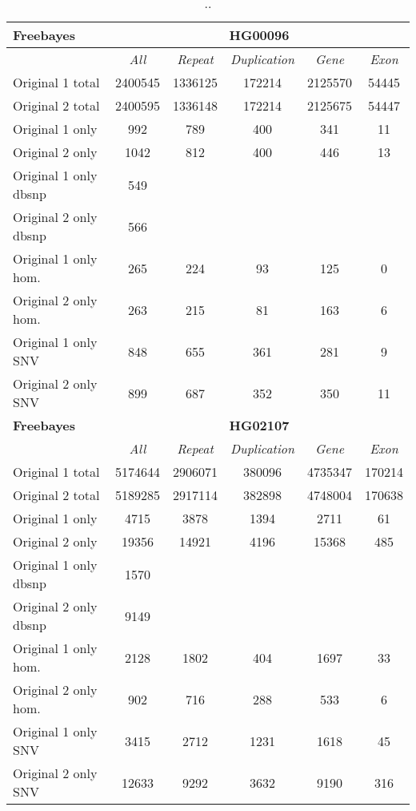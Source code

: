 \begin{table}[htb]
\begin{center}
\begin{tabular}{|l|c||c|c|c|c|}
\hline
{\bf Freebayes} & \multicolumn{5}{|c|}{\bf HG00096} \\
\hline
\cline{2-6}
{\bf} & {\it All} & {\it Repeat} & {\it Duplication} & {\it Gene} & {\it Exon} \\
\hline
Original 1 total & 2400545 & 1336125 & 172214 & 2125570 & 54445\\ 
\hline
Original 2 total & 2400595 & 1336148 & 172214 & 2125675 & 54447\\ 
\hline
Original 1 only & 992 & 789 & 400 & 341 & 11\\ 
\hline
Original 2 only & 1042 & 812 & 400 & 446 & 13\\ 
\hline
Original 1 only dbsnp & 549 &  &  &  & \\ 
\hline
Original 2 only dbsnp & 566 &  &  &  & \\ 
\hline
Original 1 only hom. & 265 & 224 & 93 & 125 & 0\\ 
\hline
Original 2 only hom. & 263 & 215 & 81 & 163 & 6\\ 
\hline
Original 1 only SNV & 848 & 655 & 361 & 281 & 9\\ 
\hline
Original 2 only SNV & 899 & 687 & 352 & 350 & 11\\ 
\hline
\hline
{\bf Freebayes} & \multicolumn{5}{|c|}{\bf HG02107} \\
\hline
\cline{2-6}
{\bf} & {\it All} & {\it Repeat} & {\it Duplication} & {\it Gene} & {\it Exon} \\
\hline
Original 1 total & 5174644 & 2906071 & 380096 & 4735347 & 170214\\ 
\hline
Original 2 total & 5189285 & 2917114 & 382898 & 4748004 & 170638\\ 
\hline
Original 1 only & 4715 & 3878 & 1394 & 2711 & 61\\ 
\hline
Original 2 only & 19356 & 14921 & 4196 & 15368 & 485\\ 
\hline
Original 1 only dbsnp & 1570 &  &  &  & \\ 
\hline
Original 2 only dbsnp & 9149 &  &  &  & \\ 
\hline
Original 1 only hom. & 2128 & 1802 & 404 & 1697 & 33\\ 
\hline
Original 2 only hom. & 902 & 716 & 288 & 533 & 6\\ 
\hline
Original 1 only SNV & 3415 & 2712 & 1231 & 1618 & 45\\ 
\hline
Original 2 only SNV & 12633 & 9292 & 3632 & 9190 & 316\\  
\hline
\end{tabular}
\end{center}
\caption{ .. }
\label{tab:orig-vs-shuf-freebayes}
\end{table}

